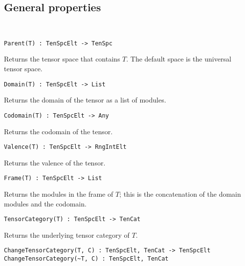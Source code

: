 \subsection{General properties}~

\color{blue}
{\small \begin{verbatim}
Parent(T) : TenSpcElt -> TenSpc
\end{verbatim} }
\color{black}

Returns the tensor space that contains $T$. The default space is the universal 
tensor space.

\color{blue}
{\small \begin{verbatim}
Domain(T) : TenSpcElt -> List
\end{verbatim} }
\color{black}

Returns the domain of the tensor as a list of modules.

\color{blue}
{\small \begin{verbatim}
Codomain(T) : TenSpcElt -> Any
\end{verbatim} }
\color{black}

Returns the codomain of the tensor.

\color{blue}
{\small \begin{verbatim}
Valence(T) : TenSpcElt -> RngIntElt
\end{verbatim} }
\color{black}

Returns the valence of the tensor.

\color{blue}
{\small \begin{verbatim}
Frame(T) : TenSpcElt -> List
\end{verbatim} }
\color{black}

Returns the modules in the frame of $T$; this is the concatenation of
the domain modules and the codomain.

\color{blue}
{\small \begin{verbatim}
TensorCategory(T) : TenSpcElt -> TenCat
\end{verbatim} }
\color{black}

Returns the underlying tensor category of $T$.

\color{blue}
{\small \begin{verbatim}
ChangeTensorCategory(T, C) : TenSpcElt, TenCat -> TenSpcElt
ChangeTensorCategory(~T, C) : TenSpcElt, TenCat
\end{verbatim} }
\color{black}

